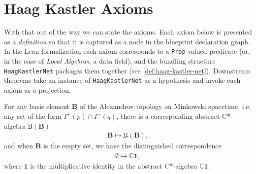 \section{Haag Kastler Axioms}\label{sctn:haag-kastler-axioms}
With that out of the way we can state the axioms. Each axiom below is presented as a \emph{definition} so that it is captured as a node in the blueprint declaration graph. In the Lean formalization each axiom corresponds to a \texttt{Prop}-valued predicate (or, in the case of \emph{Local Algebras}, a data field), and the bundling structure \texttt{HaagKastlerNet} packages them together (see \ref{def:haag-kastler-net}). Downstream theorems take an instance of \texttt{HaagKastlerNet} as a hypothesis and invoke each axiom as a projection.

\begin{definition}
    \label{def:local-algebras}
    \leanok
    For any basis element $\mathbf{B}$ of the Alexandrov topology on Minkowski spacetime, i.e. any set of the form $I^+(p) \cap I^-(q)$, there is a corresponding abstract C*-algebra $\mathfrak{U}(\mathbf{B})$
    \begin{align}
        \mathbf{B} \longmapsto \mathfrak{U}(\mathbf{B}),
    \end{align}
    and when $\mathbf{B}$ is the empty set, we have the distinguished correspondence
    \begin{align}
        \emptyset \longmapsto \mathbb{C} \mathbf{1},
    \end{align}
    where $\mathbf{1}$ is the multiplicative identity in the abstract C*-algebra $\mathbb{C} \mathbf{1}$.
\end{definition}

